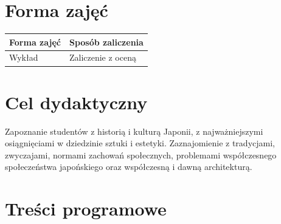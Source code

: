 \documentclass[12pt, a4paper]{article}
\begin{document}
\section{Forma zajęć}

\begin{tabular}{ll}
  \hline
  \textbf{Forma zajęć} & \textbf{Sposób zaliczenia} \\
  \hline
  Wykład & Zaliczenie z oceną \\
  \hline
\end{tabular}

\section{Cel dydaktyczny}

Zapoznanie studentów z historią i kulturą Japonii, z najważniejszymi osiągnięciami w dziedzinie sztuki i estetyki. Zaznajomienie z tradycjami, zwyczajami, normami zachowań społecznych, problemami współczesnego społeczeństwa japońskiego oraz współczesną i dawną architekturą.

\section{Treści programowe}
\end{document}
